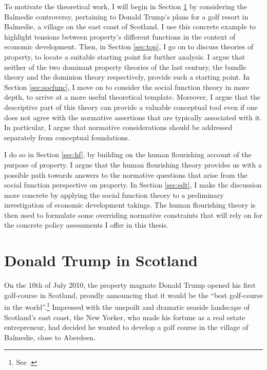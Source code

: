 To motivate the theoretical work, I will begin in Section \ref{sec:dts} by considering the Balmedie controversy, pertaining to Donald Trump's plans for a golf resort in Balmedie, a village on the east coast of Scotland. I use this concrete example to highlight tensions between property's different functions in the context of economic development. Then, in Section \ref{sec:top}, I go on to discuss theories of property, to locate a suitable starting point for further analysis. I argue that neither of the two dominant property theories of the last century, the bundle theory and the dominion theory respectively, provide such a starting point. In Section \ref{sec:socfunc}, I move on to consider the social function theory in more depth, to arrive at a more useful theoretical template. Moreover, I argue that the descriptive part of this theory can provide a valuable conceptual tool even if one does not agree with the normative assertions that are typically associated with it. In particular, I argue that normative considerations should be addressed separately from conceptual foundations.

I do so in Section \ref{sec:hf}, by building on the human flourishing account of the purpose of property. I argue that the human flourishing theory provides us with a possible path towards answers to the normative questions that arise from the social function perspective on property. In Section \ref{sec:edt}, I make the discussion more concrete by applying the social function theory to a preliminary investigation of economic development takings. The human flourishing theory is then used to formulate some overriding normative constraints that will rely on for the concrete policy assessments I offer in this thesis.

\section{Donald Trump in Scotland}\label{sec:dts}

On the 10th of July 2010, the property magnate Donald Trump opened his first golf-course in Scotland, proudly announcing that it would be the ``best golf-course in the world''.\footnote{See \cite{passow12}.} Impressed with the unspoilt and dramatic seaside landscape of Scotland's east coast, the New Yorker, who made his fortune as a real estate entrepreneur, had decided he wanted to develop a golf course in the village of Balmedie, close to Aberdeen.

